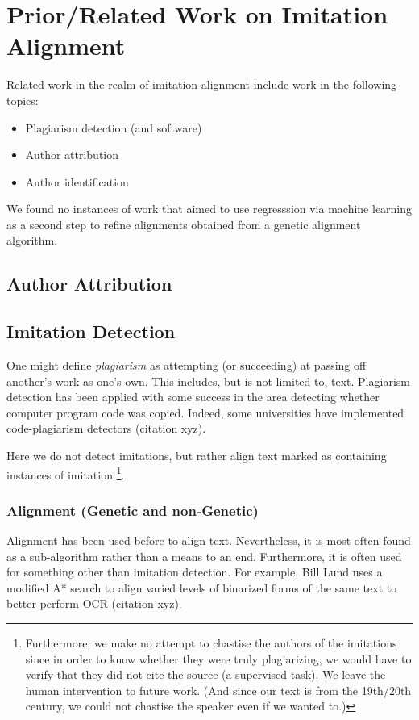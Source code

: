 \section {Prior/Related Work on Imitation Alignment}
Related work in the realm of imitation alignment include work in the following topics:
	\begin{itemize}
		\item Plagiarism detection (and software)
		\item Author attribution
		\item Author identification
	\end{itemize}

We found no instances of work that aimed to use regresssion via machine learning as a second step to refine alignments obtained from a genetic alignment algorithm.%


\subsection{Author Attribution}

\subsection{Imitation Detection}
One might define \textit{plagiarism} as attempting (or succeeding) at passing off another's work as one's own. This includes, but is not limited to, text. Plagiarism detection has been applied with some success in the area detecting whether computer program code was copied. Indeed, some universities have implemented code-plagiarism detectors (citation xyz).

Here we do not detect imitations, but rather align text marked as containing instances of imitation \footnote{Furthermore, we make no attempt to chastise the authors of the imitations since in order to know whether they were truly plagiarizing, we would have to verify that they did not cite the source (a supervised task). We leave the human intervention to future work. (And since our text is from the 19th/20th century, we could not chastise the speaker even if we wanted to.)}.

\subsubsection{Alignment (Genetic and non-Genetic)}
Alignment has been used before to align text. Nevertheless, it is most often found as a sub-algorithm rather than a means to an end. Furthermore, it is often used for something other than imitation detection. For example, Bill Lund uses a modified A* search to align varied levels of binarized forms of the same text to better perform OCR (citation xyz).

